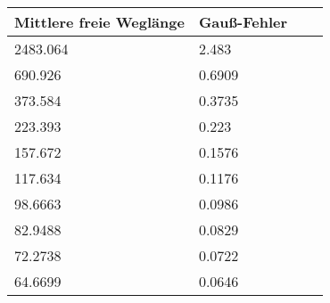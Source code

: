 \documentclass[titlepage=firstcover, captions=tableheading]{scrartcl}
\begin{document}
\begin{center}
    \begin{tabular}{l @{${}\pm{}$}lll}\\
    \toprule
    Mittlere freie Weglänge & Gauß-Fehler\\
    \midrule
    2483.064  & 2.483 \\
     690.926  & 0.6909    \\
     373.584  & 0.3735     \\
     223.393  & 0.223 \\
     157.672  & 0.1576  \\
     117.634  & 0.1176 \\
     98.6663  & 0.0986 \\
     82.9488  & 0.0829 \\
     72.2738  & 0.0722  \\
     64.6699  & 0.0646 \\
    \bottomrule
    \end{tabular}
\end{center}
\end{document}
